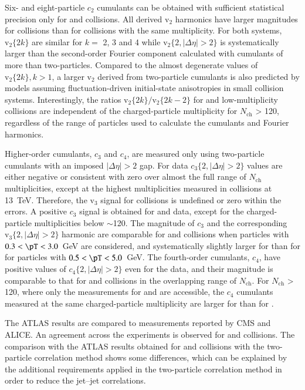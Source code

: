 \documentclass[cernpreprint,texlive=2014,txfonts,UKenglish]{latex/atlasdoc}
\begin{document}
Six- and eight-particle $c_2$ cumulants can be obtained with sufficient statistical precision only for \pPb and \PbPb collisions.   All derived $\mathrm{v}_2$ harmonics have larger magnitudes for \PbPb collisions than for  \pPb collisions with the same multiplicity. For both systems, $\mathrm{v}_2\{2k\}$ are similar for $k=$ 2, 3 and 4 while $\mathrm{v}_2\{2,|\Delta\eta| > 2\}$ is systematically larger than the second-order Fourier component calculated with cumulants of more than two-particles. Compared to the almost degenerate values of $\mathrm{v}_2\{2k\}, k>1$, a larger $\mathrm{v}_2$ derived from two-particle cumulants is also  predicted by models assuming fluctuation-driven initial-state anisotropies in small collision systems. Interestingly, the ratios $\mathrm{v}_2\{2k\}/\mathrm{v}_2\{2k-2\}$ for \pPb and low-multiplicity \PbPb collisions  are independent of the charged-particle multiplicity  for $N_{\mathrm{ch}}$  > 120, regardless of the \pT range of particles used to calculate the cumulants and Fourier harmonics. 

Higher-order cumulants, $c_3$ and $c_4$, are measured only  using two-particle cumulants with an imposed $|\Delta\eta|>2$ gap. For \pp data $c_3\{2,|\Delta\eta|>2\}$ values are either negative or consistent with zero over almost the full range of $N_{\mathrm{ch}}$ multiplicities, except at the highest multiplicities measured in \pp collisions at 13~TeV. Therefore, the $\mathrm{v}_3$ signal for \pp collisions is undefined or zero within the errors. A positive $c_3$ signal is obtained for \pPb and \PbPb data, except for the charged-particle multiplicities below $\sim$120. The magnitude of $c_3$ and the corresponding $\mathrm{v}_3\{2,|\Delta\eta| > 2\}$ harmonic are comparable for \PbPb and \pPb collisions when particles with  $0.3< \pT < 3.0$~GeV are considered, and systematically slightly larger for \PbPb than for \pPb for particles with $0.5< \pT < 5.0$~GeV.  The fourth-order cumulants, $c_4$, have positive values of $c_4\{2,|\Delta\eta|>2\}$ even for the \pp data, and their  magnitude  is comparable to that for \pPb and \PbPb collisions in the overlapping range of  $N_{\mathrm{ch}}$. For $N_{\mathrm{ch}}$ > 120, where only the measurements for \pPb and \PbPb are accessible, the $c_4$ cumulants measured at the same charged-particle multiplicity are larger for \PbPb than for \pPb.  

The ATLAS results are compared to measurements reported by CMS and ALICE. An agreement across
the experiments is observed for \pPb and \PbPb collisions. The comparison with the ATLAS results obtained for \pp and \pPb collisions with the two-particle correlation method shows some differences, which can be explained by the additional requirements applied in the two-particle correlation method in order to reduce the jet--jet correlations.
\end{document}
